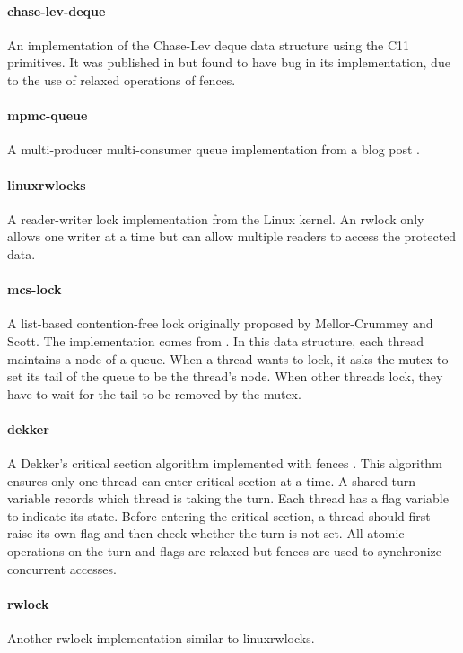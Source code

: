 \paragraph{chase-lev-deque} An implementation of the Chase-Lev deque data structure using the C11 primitives. It was published in \cite{chase-lev-deque-impl} but found to have bug in its implementation, due to the use of relaxed operations of fences. 

\paragraph{mpmc-queue} A multi-producer multi-consumer queue implementation from a blog post \cite{mpmc-queue-impl}. 

\paragraph{linuxrwlocks} A reader-writer lock implementation from the Linux kernel. An rwlock only allows one writer at a time but can allow multiple readers to access the protected data. 


\paragraph{mcs-lock} A list-based contention-free lock originally proposed by Mellor-Crummey and Scott\cite{mcs-lock}. The implementation comes from \cite{mcs-lock-impl}. In this data structure, each thread maintains a node of a queue. When a thread wants to lock, it asks the mutex to set its tail of the queue to be the thread's node. When other threads lock, they have to wait for the tail to be removed by the mutex. 

\paragraph{dekker} A Dekker's critical section algorithm implemented with fences \cite{dekker-fence-impl}. This algorithm ensures only one thread can enter critical section at a time. A shared turn variable records which thread is taking the turn. Each thread has a flag variable to indicate its state. Before entering the critical section, a thread should first raise its own flag and then check whether the turn is not set. All atomic operations on the turn and flags are relaxed but fences are used to synchronize concurrent accesses. 

\paragraph{rwlock} Another rwlock implementation similar to linuxrwlocks.
